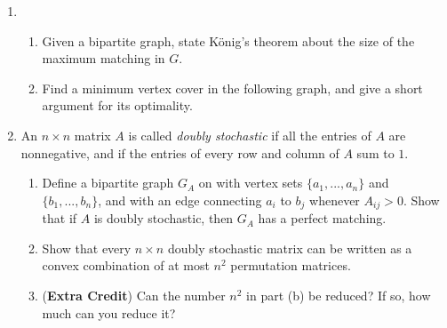 \documentclass[12pt]{article}
\begin{document}
\begin{enumerate}
\item
\begin{enumerate}
\item
Given a bipartite graph,  state K\"onig's theorem about the size of the maximum matching in $G$. 
\item  
Find a minimum vertex cover in the following
graph, and give a short argument for its optimality. 


\begin{center}
\end{center}
\end{enumerate}

\newpage
\item
An $n\times n$ matrix $A$ is called \emph{doubly stochastic} if all the entries of $A$ are nonnegative, and if the entries of every row and column of $A$ sum to $1$.
\begin{enumerate}
\item Define a bipartite graph $G_A$ on with vertex sets $\{a_1, ..., a_n\}$ and $\{b_1, ..., b_n\}$, and with an edge connecting $a_i$ to $b_j$ whenever $A_{ij} > 0$. Show that if $A$ is doubly stochastic, then $G_A$ has a perfect matching.

\item Show that every $n\times n$ doubly stochastic matrix can be written as a convex combination of at most $n^2$ permutation matrices.

\item ({\bf Extra Credit}) Can the number $n^2$ in part (b) be reduced? If so, how much can you reduce it?
\end{enumerate}


\end{enumerate}
\end{document}

